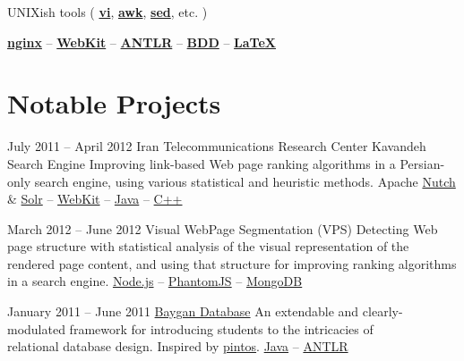 \documentclass{tccv}
\begin{document}
{{\hspace{3pt}%
UNIXish tools (%
	\href{http://www.vim.org}{\bf vi}, %
	\href{http://awk.info}{\bf awk}, %
	\href{http://www.gnu.org/software/sed/}{\bf sed}, etc.%
)%

\hspace{3pt}%
	\href{http://nginx.org/en/}{\bf nginx} -- 
	\href{http://www.webkit.org}{\bf WebKit} -- 
	\href{http://www.antlr.org}{\bf ANTLR} -- 
	\href{http://en.wikipedia.org/wiki/Behavior-driven_development}{\bf BDD} -- 
	\href{http://www.latex-project.org}{\bf \LaTeX}




\newpage





\section{Notable Projects}

\begin{project_list}

\item{July 2011 -- April 2012}
     {Iran Telecommunications Research Center}
     {Kavandeh Search Engine}
	 {Improving link-based Web page ranking algorithms in a Persian-only search engine, using various statistical and heuristic methods.}
     {%
     	Apache \href{http://nutch.apache.org}{Nutch} \&
		\href{http://lucene.apache.org/solr/}{Solr} -- 
		\href{http://www.webkit.org}{WebKit} -- 
		\href{http://www.oracle.com/technetwork/java/}{Java} -- 
		\href{https://en.wikipedia.org/wiki/C\%2B\%2B}{C++}%
	}

\vspace{-6pt}

\item{March 2012 -- June 2012}
     {}
     {Visual WebPage Segmentation {\large (VPS)}}
	 {Detecting Web page structure with statistical \mbox{analysis} of the visual representation of the rendered page content, and using that structure for improving ranking algorithms in a search engine.%
}
	 {%
	 	\href{http://nodejs.org}{Node.js} -- 
		\href{http://phantomjs.org}{PhantomJS} -- 
		\href{http://www.mongodb.org}{MongoDB}%
	 }

\vspace{-6pt}

\item{January 2011 -- June 2011}
	 {}
	 {\href{https://github.com/baygan/Baygan}{Baygan Database}}
	 {An extendable and clearly-modulated framework for introducing students to the intricacies of \\relational database design. Inspired by \href{http://www.stanford.edu/class/cs140/projects/pintos/pintos.html}{pintos}.%
}
	 {%
	 	\href{http://www.oracle.com/technetwork/java/}{Java} -- 
		\href{http://www.antlr.org}{ANTLR}%
	 }


\end{project_list}}}
\end{document}
